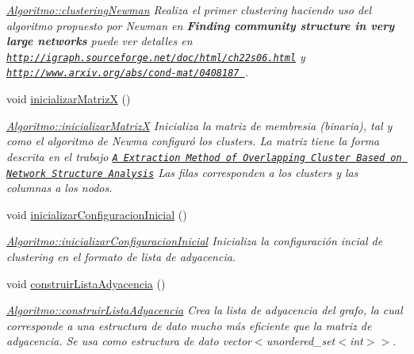 \begin{DoxyCompactItemize}
\begin{DoxyCompactList}\small\item\em \hyperlink{class_algoritmo_a718fe5e18f1b887a7c10604935664402}{Algoritmo\-::clustering\-Newman} Realiza el primer {\itshape clustering} haciendo uso del algoritmo propuesto por Newman en {\bfseries  Finding community structure in very large networks} puede ver detalles en \href{http://igraph.sourceforge.net/doc/html/ch22s06.html}{\tt http\-://igraph.\-sourceforge.\-net/doc/html/ch22s06.\-html} y \href{http://www.arxiv.org/abs/cond-mat/0408187}{\tt http\-://www.\-arxiv.\-org/abs/cond-\/mat/0408187 }. \end{DoxyCompactList}\item 
void \hyperlink{class_algoritmo_a587697ecb58bbd4f7a5bfe7188f681cb}{inicializar\-Matriz\-X} ()
\begin{DoxyCompactList}\small\item\em \hyperlink{class_algoritmo_a587697ecb58bbd4f7a5bfe7188f681cb}{Algoritmo\-::inicializar\-Matriz\-X} Inicializa la matriz de membresia (binaria), tal y como el algoritmo de Newma configur\'{o} los {\itshape clusters}. La matriz tiene la forma descrita en el trabajo \href{http://dl.acm.org/citation.cfm?id=1339693}{\tt A Extraction Method of Overlapping Cluster Based on Network Structure Analysis} Las filas corresponden a los {\itshape clusters} y las columnas a los nodos. \end{DoxyCompactList}\item 
void \hyperlink{class_algoritmo_a3fd78d6f0173d1f25ea0fc6437fa151d}{inicializar\-Configuracion\-Inicial} ()
\begin{DoxyCompactList}\small\item\em \hyperlink{class_algoritmo_a3fd78d6f0173d1f25ea0fc6437fa151d}{Algoritmo\-::inicializar\-Configuracion\-Inicial} Inicializa la configuraci\'{o}n incial de {\itshape clustering} en el formato de lista de adyacencia. \end{DoxyCompactList}\item 
void \hyperlink{class_algoritmo_a4be398fd15aaf32dc7b279ebc5ea90d7}{construir\-Lista\-Adyacencia} ()
\begin{DoxyCompactList}\small\item\em \hyperlink{class_algoritmo_a4be398fd15aaf32dc7b279ebc5ea90d7}{Algoritmo\-::construir\-Lista\-Adyacencia} Crea la lista de adyacencia del grafo, la cual corresponde a una estructura de dato mucho m\'{a}s eficiente que la matriz de adyacencia. Se usa como estructura de dato vector$<$unordered\-\_\-set$<$int$>$$>$. \end{DoxyCompactList}\end{DoxyCompactItemize}

